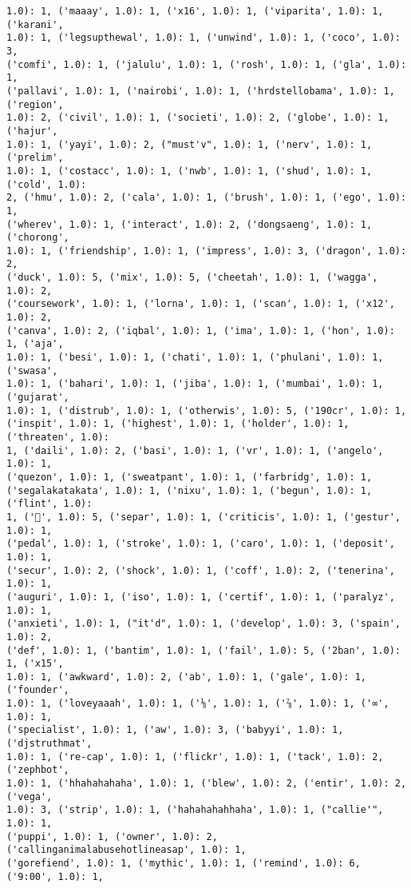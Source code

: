 \documentclass[11pt]{article}
\begin{document}
\begin{Verbatim}[commandchars=\\\{\}]
1.0): 1, ('maaay', 1.0): 1, ('x16', 1.0): 1, ('viparita', 1.0): 1, ('karani',
1.0): 1, ('legsupthewal', 1.0): 1, ('unwind', 1.0): 1, ('coco', 1.0): 3,
('comfi', 1.0): 1, ('jalulu', 1.0): 1, ('rosh', 1.0): 1, ('gla', 1.0): 1,
('pallavi', 1.0): 1, ('nairobi', 1.0): 1, ('hrdstellobama', 1.0): 1, ('region',
1.0): 2, ('civil', 1.0): 1, ('societi', 1.0): 2, ('globe', 1.0): 1, ('hajur',
1.0): 1, ('yayi', 1.0): 2, ("must'v", 1.0): 1, ('nerv', 1.0): 1, ('prelim',
1.0): 1, ('costacc', 1.0): 1, ('nwb', 1.0): 1, ('shud', 1.0): 1, ('cold', 1.0):
2, ('hmu', 1.0): 2, ('cala', 1.0): 1, ('brush', 1.0): 1, ('ego', 1.0): 1,
('wherev', 1.0): 1, ('interact', 1.0): 2, ('dongsaeng', 1.0): 1, ('chorong',
1.0): 1, ('friendship', 1.0): 1, ('impress', 1.0): 3, ('dragon', 1.0): 2,
('duck', 1.0): 5, ('mix', 1.0): 5, ('cheetah', 1.0): 1, ('wagga', 1.0): 2,
('coursework', 1.0): 1, ('lorna', 1.0): 1, ('scan', 1.0): 1, ('x12', 1.0): 2,
('canva', 1.0): 2, ('iqbal', 1.0): 1, ('ima', 1.0): 1, ('hon', 1.0): 1, ('aja',
1.0): 1, ('besi', 1.0): 1, ('chati', 1.0): 1, ('phulani', 1.0): 1, ('swasa',
1.0): 1, ('bahari', 1.0): 1, ('jiba', 1.0): 1, ('mumbai', 1.0): 1, ('gujarat',
1.0): 1, ('distrub', 1.0): 1, ('otherwis', 1.0): 5, ('190cr', 1.0): 1,
('inspit', 1.0): 1, ('highest', 1.0): 1, ('holder', 1.0): 1, ('threaten', 1.0):
1, ('daili', 1.0): 2, ('basi', 1.0): 1, ('vr', 1.0): 1, ('angelo', 1.0): 1,
('quezon', 1.0): 1, ('sweatpant', 1.0): 1, ('farbridg', 1.0): 1,
('segalakatakata', 1.0): 1, ('nixu', 1.0): 1, ('begun', 1.0): 1, ('flint', 1.0):
1, ('🍰', 1.0): 5, ('separ', 1.0): 1, ('criticis', 1.0): 1, ('gestur', 1.0): 1,
('pedal', 1.0): 1, ('stroke', 1.0): 1, ('caro', 1.0): 1, ('deposit', 1.0): 1,
('secur', 1.0): 2, ('shock', 1.0): 1, ('coff', 1.0): 2, ('tenerina', 1.0): 1,
('auguri', 1.0): 1, ('iso', 1.0): 1, ('certif', 1.0): 1, ('paralyz', 1.0): 1,
('anxieti', 1.0): 1, ("it'd", 1.0): 1, ('develop', 1.0): 3, ('spain', 1.0): 2,
('def', 1.0): 1, ('bantim', 1.0): 1, ('fail', 1.0): 5, ('2ban', 1.0): 1, ('x15',
1.0): 1, ('awkward', 1.0): 2, ('ab', 1.0): 1, ('gale', 1.0): 1, ('founder',
1.0): 1, ('loveyaaah', 1.0): 1, ('⅛', 1.0): 1, ('⅞', 1.0): 1, ('∞', 1.0): 1,
('specialist', 1.0): 1, ('aw', 1.0): 3, ('babyyi', 1.0): 1, ('djstruthmat',
1.0): 1, ('re-cap', 1.0): 1, ('flickr', 1.0): 1, ('tack', 1.0): 2, ('zephbot',
1.0): 1, ('hhahahahaha', 1.0): 1, ('blew', 1.0): 2, ('entir', 1.0): 2, ('vega',
1.0): 3, ('strip', 1.0): 1, ('hahahahahhaha', 1.0): 1, ("callie'", 1.0): 1,
('puppi', 1.0): 1, ('owner', 1.0): 2, ('callinganimalabusehotlineasap', 1.0): 1,
('gorefiend', 1.0): 1, ('mythic', 1.0): 1, ('remind', 1.0): 6, ('9:00', 1.0): 1,

\end{Verbatim}
\end{document}
